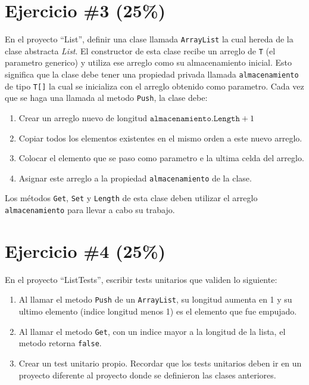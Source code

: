 \documentclass{article}
\begin{document}
\section*{Ejercicio \#3 (25\%)}
En el proyecto ``List'', definir una clase llamada \texttt{ArrayList} la cual hereda de la clase abstracta
\emph{List}. El constructor de esta clase recibe un arreglo de \texttt{T} (el 
parametro generico) y utiliza ese arreglo como su almacenamiento inicial. Esto
significa que la clase debe tener una propiedad privada llamada \texttt{almacenamiento}
de tipo \texttt{T[]} la cual se inicializa con el arreglo obtenido como parametro.
Cada vez que se haga una llamada al metodo \texttt{Push}, la clase debe:
\begin{enumerate}
        \item{Crear un arreglo nuevo de longitud $\mathtt{almacenamiento.Length}+1$}
        \item{Copiar todos los elementos existentes en el mismo orden a este nuevo arreglo.}
        \item{Colocar el elemento que se paso como parametro e la ultima celda del arreglo.}
        \item{Asignar este arreglo a la propiedad \texttt{almacenamiento} de la clase.}
\end{enumerate}
Los m\'etodos \texttt{Get}, \texttt{Set} y \texttt{Length} de esta clase deben utilizar
el arreglo \texttt{almacenamiento} para llevar a cabo su trabajo. 
\section*{Ejercicio \#4 (25\%)}
En el proyecto ``ListTests'', escribir tests unitarios que validen lo siguiente:
\begin{enumerate}
        \item{Al llamar el metodo \texttt{Push} de un \texttt{ArrayList}, su longitud
        aumenta en 1 y su ultimo elemento (indice longitud menos 1) es el elemento que
        fue empujado.}
        \item{Al llamar el metodo \texttt{Get}, con un indice mayor a la longitud de la
        lista, el metodo retorna \texttt{false}.}
        \item{Crear un test unitario propio.}
Recordar que los tests unitarios deben ir en un proyecto diferente al proyecto
donde se definieron las clases anteriores.
\end{enumerate}
\end{document}
